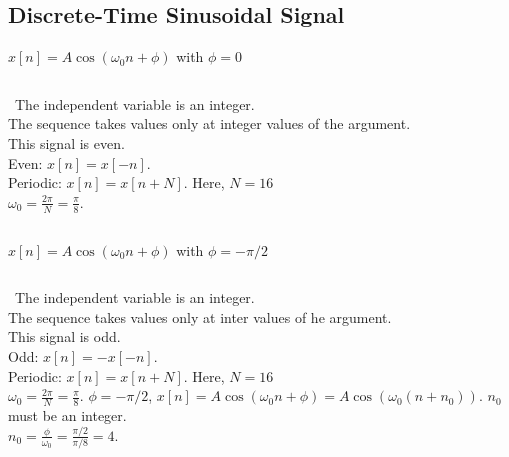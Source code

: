\subsection{Discrete-Time Sinusoidal Signal}

\begin{frame}[plain]{$x[n] = A\cos(\omega_0n+\phi)$ with $\phi = 0$}
    {
        \begin{columns}[t]
            {
                \centering
                
            }
            {
                \noindent~The independent variable is an integer.\\
                The sequence takes values only at integer values of the argument.\\
                This signal is \alert{even}. \\[12pt]
                Even: $x[n] = x[-n]$.\\
                Periodic: $x[n] = x[n+N]$. Here, $N=16$\\
                $\omega_0 = \frac{2\pi}{N} = \frac{\pi}{8}$.


            }
        \end{columns}
    }
\end{frame}


\begin{frame}[plain]{$x[n] = A\cos(\omega_0n+\phi)$ with $\phi = -\pi/2$}
    {
        \begin{columns}[t]
            {
                \centering
                
            }
            {
                \noindent~The independent variable is an integer.\\
                The sequence takes values only at inter values of he argument.\\
                This signal is \alert{odd}. \\[12pt]
                Odd: $x[n] = -x[-n]$.\\
                Periodic: $x[n] = x[n+N]$. Here, $N=16$\\
                $\omega_0 = \frac{2\pi}{N} = \frac{\pi}{8}$.
                $\phi= -\pi/2$, $x[n] = A\cos(\omega_0n+\phi) = A\cos(\omega_0(n+n_0))$. $n_0$ must be an integer.\\
                $n_0 = \frac{\phi}{\omega_0} = \frac{\pi/2}{\pi/8} = 4$.


            }
        \end{columns}
    }
\end{frame}




